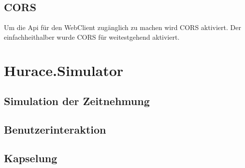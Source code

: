\documentclass[a4paper, 12pt]{article}
\begin{document}
	\subsection{CORS}
	Um die Api für den WebClient zugänglich zu machen wird CORS aktiviert. Der einfachheithalber wurde CORS für weitestgehend aktiviert.
	
	
	\section{Hurace.Simulator}
	\subsection{Simulation der Zeitnehmung}
	
	\subsection{Benutzerinteraktion}
	
	\subsection{Kapselung}
	
	\listoftodos
\end{document}
